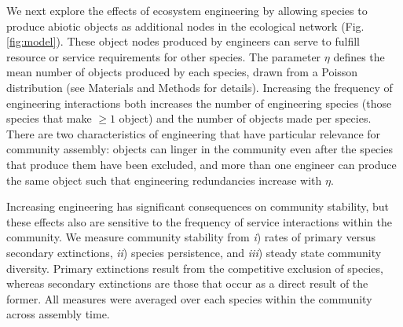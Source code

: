 \documentclass[9pt,twocolumn,twoside]{pnas-new}
\begin{document}
We next explore the effects of ecosystem engineering by allowing species to produce abiotic objects as additional nodes in the ecological network (Fig. \ref{fig:model}).
These object nodes produced by engineers can serve to fulfill resource or service requirements for other species.
The parameter $\eta$ defines the mean number of objects produced by each species, drawn from a Poisson distribution (see Materials and Methods for details).
Increasing the frequency of engineering interactions both increases the number of engineering species (those species that make $\geq 1$ object) and the number of objects made per species.
There are two characteristics of engineering that have particular relevance for community assembly:
objects can linger in the community even after the species that produce them have been excluded, and
more than one engineer can produce the same object such that engineering redundancies increase with $\eta$.






Increasing engineering has significant consequences on community stability, but these effects also are sensitive to the frequency of service interactions within the community.
We measure community stability from 
\emph{i}) rates of primary versus secondary extinctions,
\emph{ii}) species persistence, and 
\emph{iii}) steady state community diversity.
Primary extinctions result from the competitive exclusion of species, whereas secondary extinctions are those that occur as a direct result of the former.
All measures were averaged over each species within the community across assembly time.
\end{document}
